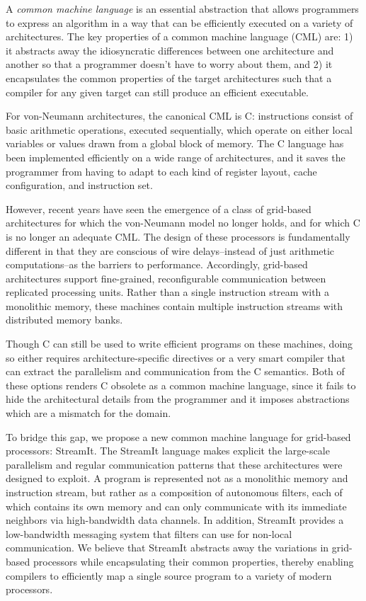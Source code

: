 \documentclass{sig-alternate}
\begin{document}
A {\it common machine language} is an essential abstraction that
allows programmers to express an algorithm in a way that can be
efficiently executed on a variety of architectures.  The key
properties of a common machine language (CML) are: 1) it abstracts
away the idiosyncratic differences between one architecture and
another so that a programmer doesn't have to worry about them, and 2)
it encapsulates the common properties of the target architectures such
that a compiler for any given target can still produce an efficient
executable.  

For von-Neumann architectures, the canonical CML is C: instructions
consist of basic arithmetic operations, executed sequentially, which
operate on either local variables or values drawn from a global block
of memory.  The C language has been implemented efficiently on a wide
range of architectures, and it saves the programmer from having to
adapt to each kind of register layout, cache configuration, and
instruction set.

However, recent years have seen the emergence of a class of grid-based
architectures \cite{smartmemories, trips, raw} for which the
von-Neumann model no longer holds, and for which C is no longer an
adequate CML.  The design of these processors is fundamentally
different in that they are conscious of wire delays--instead of just
arithmetic computations--as the barriers to performance.  Accordingly,
grid-based architectures support fine-grained, reconfigurable
communication between replicated processing units.  Rather than a
single instruction stream with a monolithic memory, these machines
contain multiple instruction streams with distributed memory banks.

Though C can still be used to write efficient programs on these
machines, doing so either requires architecture-specific directives or
a very smart compiler that can extract the parallelism and
communication from the C semantics.  Both of these options renders C
obsolete as a common machine language, since it fails to hide the
architectural details from the programmer and it imposes abstractions
which are a mismatch for the domain.

To bridge this gap, we propose a new common machine language for
grid-based processors: StreamIt.  The StreamIt language makes explicit
the large-scale parallelism and regular communication patterns that
these architectures were designed to exploit.  A program is
represented not as a monolithic memory and instruction stream, but
rather as a composition of autonomous filters, each of which contains
its own memory and can only communicate with its immediate neighbors
via high-bandwidth data channels.  In addition, StreamIt provides a
low-bandwidth messaging system that filters can use for non-local
communication.  We believe that StreamIt abstracts away the variations
in grid-based processors while encapsulating their common properties,
thereby enabling compilers to efficiently map a single source program
to a variety of modern processors.
\end{document}
